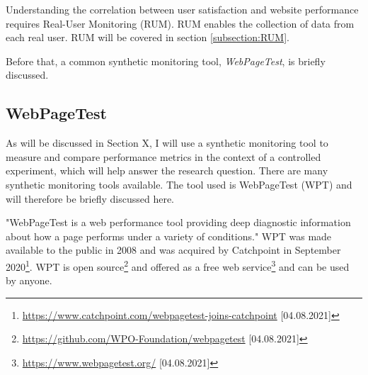 Understanding the correlation between user satisfaction and website performance requires Real-User Monitoring (RUM).
RUM enables the collection of data from each real user.
RUM will be covered in section \ref{subsection:RUM}.

Before that, a common synthetic monitoring tool, \textit{WebPageTest}, is briefly discussed.








\subsection{WebPageTest} %
\label{subsection:webpagetest}

As will be discussed in Section X, I will use a synthetic monitoring tool to measure and compare performance metrics in the context of a controlled experiment, which will help answer the research question.
There are many synthetic monitoring tools available. 
The tool used is WebPageTest (WPT) and will therefore be briefly discussed here.

"WebPageTest is a web performance tool providing deep diagnostic information about how a page performs under a variety of conditions." %
WPT was made available to the public in 2008 and was acquired by Catchpoint in September 2020\footnote{\url{https://www.catchpoint.com/webpagetest-joins-catchpoint} [04.08.2021]}.
WPT is open source\footnote{\url{https://github.com/WPO-Foundation/webpagetest} [04.08.2021]} and offered as a free web service\footnote{\url{https://www.webpagetest.org/} [04.08.2021]} and can be used by anyone.

